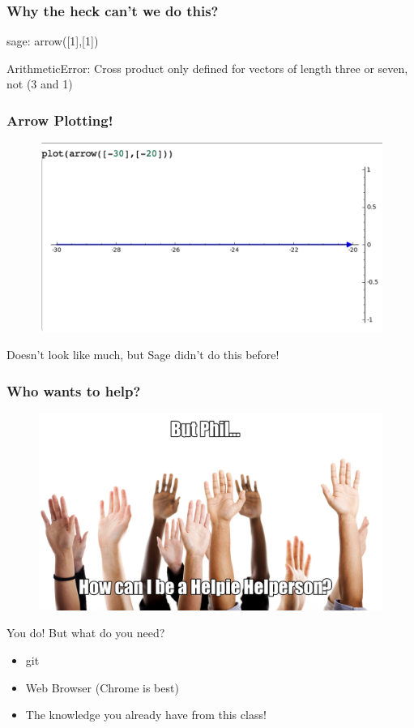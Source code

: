 \documentclass[xcolor=dvipsnames]{beamer}
\begin{document}
\begin{frame}

\frametitle{Why the heck can't we do this?}

sage: arrow([1],[1])

\vspace{3mm}

ArithmeticError: Cross product only defined for vectors of length three or seven, not (3 and 1)

\end{frame}

\begin{frame}

\frametitle{Arrow Plotting!}

\begin{figure}[H]
    \centering
        \includegraphics[width=.80\textwidth]{arrow}
\end{figure}

\centerline{Doesn't look like much, but Sage didn't do this before!}

\end{frame}

\begin{frame}

\frametitle{Who wants to help?}

\begin{figure}[H]
    \centering
        \includegraphics[width=.85\textwidth]{handsup}
\end{figure}

\centerline{You do! But what do you need?}

\begin{itemize}
  \item git
  \item Web Browser (Chrome is best)
  \item {\Large The knowledge you already have from this class!}
\end{itemize}

\end{frame}
\end{document}
